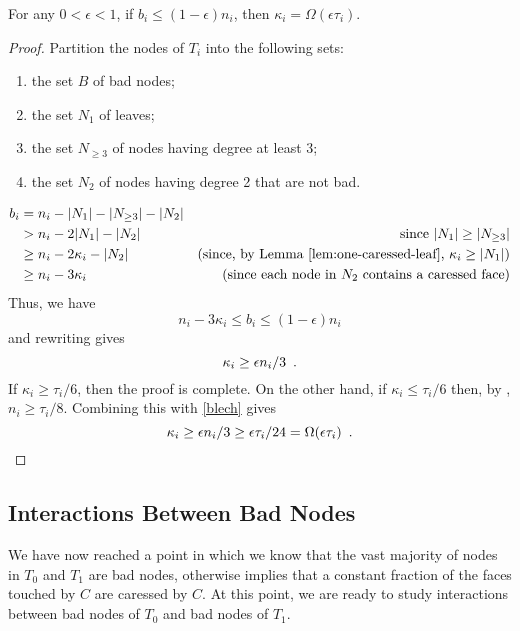\documentclass[a4paper,UKenglish]{socg-lipics-v2019}
\begin{document}
\begin{lem}
   For any $0<\epsilon < 1$, if $b_i \le (1-\epsilon)n_i$, then
   $\kappa_i = \Omega(\epsilon\tau_i)$.
\end{lem}

\begin{proof}
   Partition the nodes of $T_i$ into the following sets:
   \begin{enumerate}
       \item the set $B$ of bad nodes;
       \item the set $N_1$ of leaves;
       \item the set $N_{\ge 3}$ of nodes having degree at least 3;
       \item the set $N_2$ of nodes having degree 2 that are not bad.
   \end{enumerate}
   \begin{align*}
     b_i & = n_i - |N_1|- |N_{\ge 3}|-|N_2| \\
	   & > n_i - 2|N_1|-|N_2| & \text{since $|N_1|\ge |N_{\ge 3}|$} \\
         & \ge  n_i - 2\kappa_i -|N_2| 
	   & \text{(since, by \lemref{one-caressed-leaf}, $\kappa_i\ge |N_1|$)} \\
           & \ge  n_i - 3\kappa_i 
           & \text{(since each node in $N_2$ contains a caressed face)}
    \end{align*}
    Thus, we have
    \[
          n_i-3\kappa_i \le b_i \le (1-\epsilon)n_i
    \]
    and rewriting gives 
    \begin{equation}
      \kappa_i \ge \epsilon n_i/3 \enspace . \eqlabel{blech}
    \end{equation}
    If $\kappa_i \ge \tau_i/6$, then the proof is complete.  On the other hand, if $\kappa_i \le \tau_i/6$ then, by , $n_i \ge \tau_i/8$. Combining this with \eqref{blech}  gives
    \[
      \kappa_i \ge \epsilon n_i/3 \ge \epsilon\tau_i/24 = \Omega(\epsilon \tau_i) \enspace . \qedhere
    \]
\end{proof}

\subsection{Interactions Between Bad Nodes}

We have now reached a point in which we know that the vast
majority of nodes in $T_0$ and $T_1$ are bad nodes, otherwise
 implies that a constant fraction of the
faces touched by $C$ are caressed by $C$.  At this point, we are ready
to study interactions between bad nodes of $T_0$ and bad nodes of $T_1$.
\end{document}
